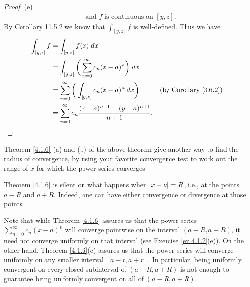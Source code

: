 \begin{proof}{(e)}
\begin{align*}
         & \text{ and } f \text{ is continuous on } [y, z].
    \end{align*}
    By Corollary 11.5.2 we know that \(\int_{[y, z]} f\) is well-defined.
    Thus we have
    \begin{align*}
        \int_{[y, z]} f & = \int_{[y, z]} f(x) \; dx                                                                                     \\
                        & = \int_{[y, z]} \bigg(\sum_{n = 0}^\infty c_n (x - a)^n\bigg) \; dx                                            \\
                        & = \sum_{n = 0}^\infty \bigg(\int_{[y, z]} c_n (x - a)^n \; dx\bigg)        & \text{(by Corollary \ref{3.6.2})} \\
                        & = \sum_{n = 0}^\infty c_n \frac{(z - a)^{n + 1} - (y - a)^{n + 1}}{n + 1}.
    \end{align*}
\end{proof}

\begin{note}
    Theorem \ref{4.1.6} (a) and (b) of the above theorem give another way to find the radius of convergence, by using your favorite convergence test to work out the range of \(x\) for which the power series converges.
\end{note}

\setcounter{theorem}{7}
\begin{remark}\label{4.1.8}
    Theorem \ref{4.1.6} is silent on what happens when \(\abs*{x - a} = R\), i.e., at the points \(a - R\) and \(a + R\).
    Indeed, one can have either convergence or divergence at those points.
\end{remark}

\begin{remark}\label{4.1.9}
    Note that while Theorem \ref{4.1.6} assures us that the power series \(\sum_{n = 0}^\infty c_n (x - a)^n\) will converge pointwise on the interval \((a - R, a + R)\), it need not converge uniformly on that interval
    (see Exercise \ref{ex 4.1.2}(e)).
    On the other hand, Theorem \ref{4.1.6}(c) assures us that the power series will converge uniformly on any smaller interval \([a - r, a + r]\).
    In particular, being uniformly convergent on every closed subinterval of \((a - R, a + R)\) is not enough to guarantee being uniformly convergent on all of \((a - R, a + R)\).
\end{remark}

\exercisesection

